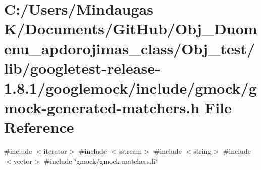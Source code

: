 \hypertarget{_obj__test_2lib_2googletest-release-1_88_81_2googlemock_2include_2gmock_2gmock-generated-matchers_8h}{}\section{C\+:/\+Users/\+Mindaugas K/\+Documents/\+Git\+Hub/\+Obj\+\_\+\+Duomenu\+\_\+apdorojimas\+\_\+class/\+Obj\+\_\+test/lib/googletest-\/release-\/1.8.1/googlemock/include/gmock/gmock-\/generated-\/matchers.h File Reference}
\label{_obj__test_2lib_2googletest-release-1_88_81_2googlemock_2include_2gmock_2gmock-generated-matchers_8h}
{\ttfamily \#include $<$iterator$>$}\newline
{\ttfamily \#include $<$sstream$>$}\newline
{\ttfamily \#include $<$string$>$}\newline
{\ttfamily \#include $<$vector$>$}\newline
{\ttfamily \#include \char`\"{}gmock/gmock-\/matchers.\+h\char`\"{}}\newline
